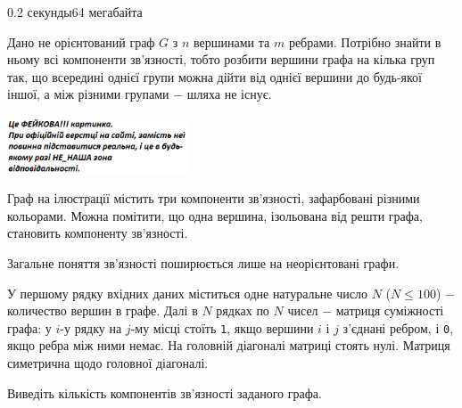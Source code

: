 \begin{problem}{}{}{}{0.2 секунды}{64 мегабайта}

Дано не орієнтований граф $G$ з $n$ вершинами та $m$ ребрами. Потрібно знайти в ньому всі компоненти зв'язності, 
тобто розбити вершини графа на кілька груп так, що всередині однієї групи можна дійти від однієї вершини до будь-якої іншої,
а між різними групами $-$ шляха не існує.

  \begin{center}
    \includegraphics[width=0.40\textwidth,natwidth=232,natheight=217]{pic.png}
  \end{center}

Граф на ілюстрації містить три компоненти зв'язності, зафарбовані різними кольорами.
Можна помітити, що одна вершина, ізольована від решти графа, становить компоненту зв'язності.


Загальне поняття зв'язності поширюється лише на неорієнтовані графи.

\InputFile
У першому рядку вхідних даних міститься одне натуральне число $N$ ($N \leqslant 100$) $-$ количество вершин в графе.
Далі в $N$ рядках по $N$ чисел $-$ матриця суміжності графа: у $i$-у рядку на $j$-му місці стоїть \texttt{1}, якщо вершини $i$ і $j$ 
з'єднані ребром, і \texttt{0}, якщо ребра між ними немає. 
На головній діагоналі матриці стоять нулі. Матриця симетрична щодо головної діагоналі.

\OutputFile
Виведіть кількість компонентів зв'язності заданого графа.


\Example
\begin{example}
%
\end{example}

\end{problem}
